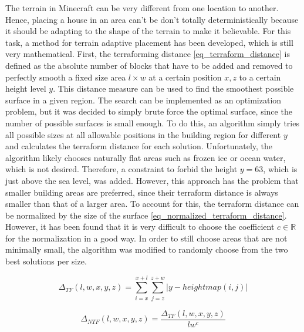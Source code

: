 \documentclass[
oneside,
fontsize=11pt
]{scrartcl}
\begin{document}
The terrain in Minecraft can be very different from one location to another. 
Hence, placing a house in an area can't be don't totally deterministically 
because it should be adapting to the shape of the terrain 
to make it believable. 
For this task, a method for terrain adaptive placement has been developed, 
which is still very mathematical. 
First, the terraforming distance \autoref{eq_terraform_distance} is defined 
as the absolute number of blocks that have to be added 
and removed to perfectly smooth a fixed size area $l \times w$ 
at a certain position $x,z$ to a certain height level $y$. 
This distance measure can be used to find the smoothest possible surface in a given region. 
The search can be implemented as an optimization problem, 
but it was decided to simply brute force the optimal surface, 
since the number of possible surfaces is small enough. 
To do this, an algorithm simply tries all possible sizes at 
all allowable positions in the building region for 
different $y$ and calculates the terraform distance for each solution. 
Unfortunately, the algorithm likely chooses naturally flat areas 
such as frozen ice or ocean water, which is not desired. 
Therefore, a constraint to forbid the height $y=63$, which is just above the sea level, was added.
However, this approach has the problem that smaller building areas are preferred, 
since their terraform distance is always smaller than that of a larger area. 
To account for this, the terraform distance can be normalized by the size of the surface \autoref{eq_normalized_terraform_distance}. 
However, it has been found that it is very difficult to choose the coefficient $c \in \mathbb{R}$ for the normalization in a good way.
In order to still choose areas that are not minimally small, 
the algorithm was modified to randomly choose from the two best solutions per size.

\begin{equation}
  \Delta_{TF} (l,w,x,y,z) = \sum_{i=x}^{x+l} \sum_{j=z}^{z+w} | y - heightmap(i,j) |
  \label{eq_terraform_distance}
\end{equation}

\begin{equation}
  \Delta_{NTF} (l,w,x,y,z) = \frac{\Delta_{TF} (l,w,x,y,z)}{lw^c}
  \label{eq_normalized_terraform_distance}
\end{equation}

\end{document}
